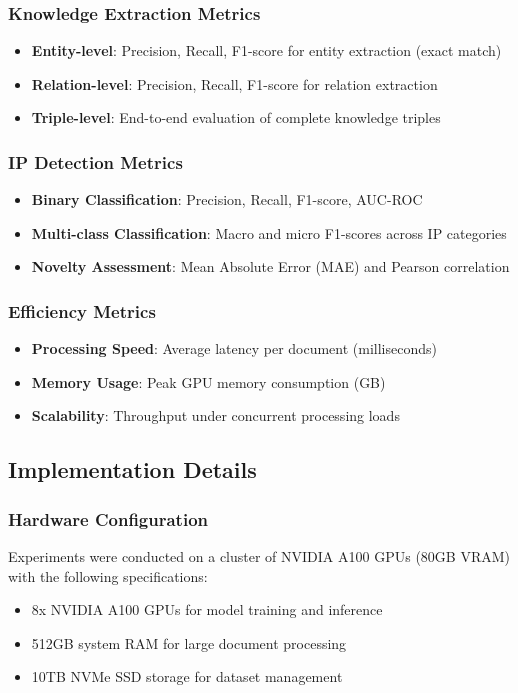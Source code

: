 \documentclass[11pt,a4paper]{article}
\begin{document}
\subsubsection{Knowledge Extraction Metrics}
\begin{itemize}
  \item \textbf{Entity-level}: Precision, Recall, F1-score for entity extraction (exact match)
  \item \textbf{Relation-level}: Precision, Recall, F1-score for relation extraction
  \item \textbf{Triple-level}: End-to-end evaluation of complete knowledge triples
\end{itemize}

\subsubsection{IP Detection Metrics}
\begin{itemize}
  \item \textbf{Binary Classification}: Precision, Recall, F1-score, AUC-ROC
  \item \textbf{Multi-class Classification}: Macro and micro F1-scores across IP categories
  \item \textbf{Novelty Assessment}: Mean Absolute Error (MAE) and Pearson correlation
\end{itemize}

\subsubsection{Efficiency Metrics}
\begin{itemize}
  \item \textbf{Processing Speed}: Average latency per document (milliseconds)
  \item \textbf{Memory Usage}: Peak GPU memory consumption (GB)
  \item \textbf{Scalability}: Throughput under concurrent processing loads
\end{itemize}

\subsection{Implementation Details}

\subsubsection{Hardware Configuration}
Experiments were conducted on a cluster of NVIDIA A100 GPUs (80GB VRAM) with the following specifications:
\begin{itemize}
  \item 8x NVIDIA A100 GPUs for model training and inference
  \item 512GB system RAM for large document processing
  \item 10TB NVMe SSD storage for dataset management
\end{itemize}
\end{document}
